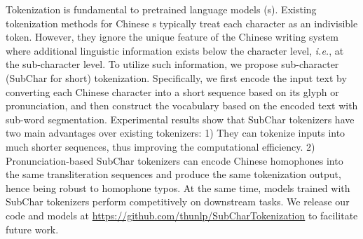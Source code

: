Tokenization is fundamental to pretrained language models (\plm{}s).
Existing tokenization methods for Chinese \plm{}s typically treat each character as an indivisible token. However, they ignore the unique feature of the Chinese writing system where additional linguistic information exists below the character level, \textit{i.e.}, at the sub-character level.
To utilize such information, we propose sub-character (SubChar for short) tokenization.
Specifically, we first encode the input text by converting each Chinese character into a short sequence based on its glyph or pronunciation, and then construct the vocabulary based on the encoded text with sub-word segmentation. 
%
%
Experimental results show that SubChar tokenizers have two main advantages over existing tokenizers: 1) They can tokenize inputs into much shorter sequences, thus improving the computational efficiency. 2) Pronunciation-based SubChar tokenizers can encode Chinese homophones into the same transliteration sequences and produce the same tokenization output, hence being robust to homophone typos.
At the same time, models trained with SubChar tokenizers perform competitively on downstream tasks. 
We release our code and models at \url{https://github.com/thunlp/SubCharTokenization} to facilitate future work.

